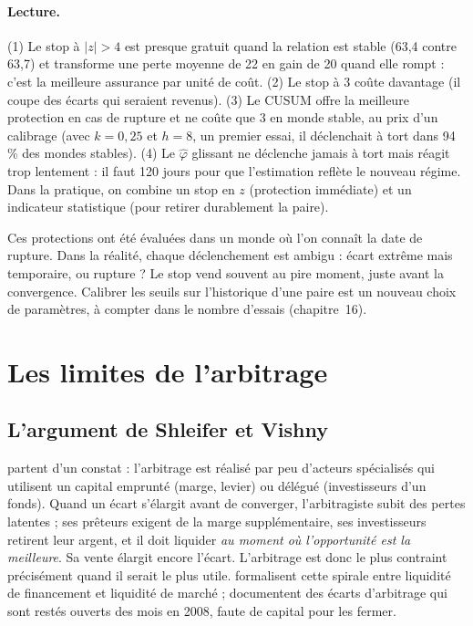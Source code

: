 \paragraph{Lecture.} (1) Le stop à $|z|>4$ est presque gratuit quand la relation est stable (63,4 contre 63,7) et transforme une perte moyenne de 22 en gain de 20 quand elle rompt : c'est la meilleure assurance par unité de coût. (2) Le stop à 3 coûte davantage (il coupe des écarts qui seraient revenus). (3) Le CUSUM offre la meilleure protection en cas de rupture et ne coûte que 3 en monde stable, au prix d'un calibrage (avec $k = 0{,}25$ et $h = 8$, un premier essai, il déclenchait à tort dans 94\,\% des mondes stables). (4) Le $\hat\varphi$ glissant ne déclenche jamais à tort mais réagit trop lentement : il faut 120 jours pour que l'estimation reflète le nouveau régime. Dans la pratique, on combine un stop en $z$ (protection immédiate) et un indicateur statistique (pour retirer durablement la paire).

\begin{pitfall}
Ces protections ont été évaluées dans un monde où l'on connaît la date de rupture. Dans la réalité, chaque déclenchement est ambigu : écart extrême mais temporaire, ou rupture ? Le stop vend souvent au pire moment, juste avant la convergence. Calibrer les seuils sur l'historique d'une paire est un nouveau choix de paramètres, à compter dans le nombre d'essais (chapitre~16).
\end{pitfall}

\section{Les limites de l'arbitrage}

\subsection{L'argument de Shleifer et Vishny}

\citet{shleifer1997} partent d'un constat : l'arbitrage est réalisé par peu d'acteurs spécialisés qui utilisent un capital emprunté (marge, levier) ou délégué (investisseurs d'un fonds). Quand un écart s'élargit avant de converger, l'arbitragiste subit des pertes latentes ; ses prêteurs exigent de la marge supplémentaire, ses investisseurs retirent leur argent, et il doit liquider \emph{au moment où l'opportunité est la meilleure}. Sa vente élargit encore l'écart. L'arbitrage est donc le plus contraint précisément quand il serait le plus utile. \citet{brunnermeier2009} formalisent cette spirale entre liquidité de financement et liquidité de marché ; \citet{mitchell2010} documentent des écarts d'arbitrage qui sont restés ouverts des mois en 2008, faute de capital pour les fermer.

